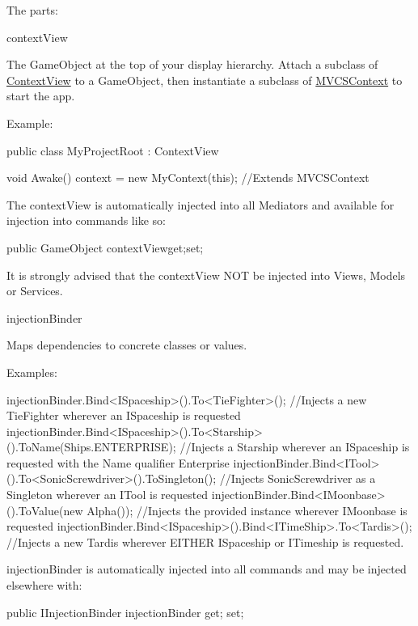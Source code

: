The parts\-: 
\begin{DoxyItemize}
\item context\-View

The Game\-Object at the top of your display hierarchy. Attach a subclass of \hyperlink{classstrange_1_1extensions_1_1context_1_1impl_1_1_context_view}{Context\-View} to a Game\-Object, then instantiate a subclass of \hyperlink{classstrange_1_1extensions_1_1context_1_1impl_1_1_m_v_c_s_context}{M\-V\-C\-S\-Context} to start the app.

Example\-: \begin{DoxyVerb}public class MyProjectRoot : ContextView
{

    void Awake()
    {
        context = new MyContext(this); //Extends MVCSContext
    }
}
\end{DoxyVerb}


The context\-View is automatically injected into all Mediators and available for injection into commands like so\-: \begin{DoxyVerb}
public GameObject contextView{get;set;}
\end{DoxyVerb}


It is strongly advised that the context\-View N\-O\-T be injected into Views, Models or Services.


\item injection\-Binder

Maps dependencies to concrete classes or values.

Examples\-: \begin{DoxyVerb}injectionBinder.Bind<ISpaceship>().To<TieFighter>(); //Injects a new TieFighter wherever an ISpaceship is requested
injectionBinder.Bind<ISpaceship>().To<Starship>().ToName(Ships.ENTERPRISE); //Injects a Starship wherever an ISpaceship is requested with the Name qualifier Enterprise
injectionBinder.Bind<ITool>().To<SonicScrewdriver>().ToSingleton(); //Injects SonicScrewdriver as a Singleton wherever an ITool is requested
injectionBinder.Bind<IMoonbase>().ToValue(new Alpha()); //Injects the provided instance wherever IMoonbase is requested
injectionBinder.Bind<ISpaceship>().Bind<ITimeShip>.To<Tardis>(); //Injects a new Tardis wherever EITHER ISpaceship or ITimeship is requested.
\end{DoxyVerb}


{\ttfamily injection\-Binder} is automatically injected into all commands and may be injected elsewhere with\-: \begin{DoxyVerb}[Inject]
public IInjectionBinder injectionBinder{ get; set;}
\end{DoxyVerb}




\end{DoxyItemize}
